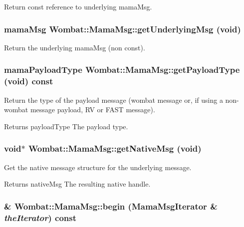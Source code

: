 Return const reference to underlying mamaMsg. \hypertarget{classWombat_1_1MamaMsg_a2669715e4dfbb437608dafed3f90875f}{
\subsubsection[{getUnderlyingMsg}]{\setlength{\rightskip}{0pt plus 5cm}mamaMsg Wombat::MamaMsg::getUnderlyingMsg (void)}}
\label{classWombat_1_1MamaMsg_a2669715e4dfbb437608dafed3f90875f}


Return the underlying mamaMsg (non const). \hypertarget{classWombat_1_1MamaMsg_a9b4b186a1b2e75f8a7a15661167e8d7e}{
\subsubsection[{getPayloadType}]{\setlength{\rightskip}{0pt plus 5cm}mamaPayloadType Wombat::MamaMsg::getPayloadType (void) const}}
\label{classWombat_1_1MamaMsg_a9b4b186a1b2e75f8a7a15661167e8d7e}


Return the type of the payload message (wombat message or, if using a non-\/wombat message payload, RV or FAST message). \begin{DoxyReturn}{Returns}
payloadType The payload type. 
\end{DoxyReturn}
\hypertarget{classWombat_1_1MamaMsg_adebf4f1745058281c115046cd3ba06b6}{
\subsubsection[{getNativeMsg}]{\setlength{\rightskip}{0pt plus 5cm}void$\ast$ Wombat::MamaMsg::getNativeMsg (void)}}
\label{classWombat_1_1MamaMsg_adebf4f1745058281c115046cd3ba06b6}


Get the native message structure for the underlying message. \begin{DoxyReturn}{Returns}
nativeMsg The resulting native handle. 
\end{DoxyReturn}
\hypertarget{classWombat_1_1MamaMsg_a9857b65d95f630a676166fc72dd0f156}{
\subsubsection[{begin}]{\& Wombat::MamaMsg::begin ({\bf MamaMsgIterator} \& {\em theIterator}) const}}
\label{classWombat_1_1MamaMsg_a9857b65d95f630a676166fc72dd0f156}


